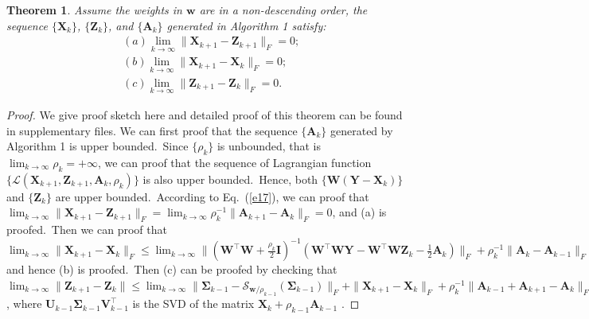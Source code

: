 \documentclass[10pt,twocolumn,letterpaper,sort&compress]{article}
\newtheorem{theorem}{Theorem}
\begin{document}
\begin{theorem}
\label{t1}
Assume the weights in $\bm{w}$ are in a non-descending order, the sequence $\{\mathbf{X}_{k}\}$, $\{\mathbf{Z}_{k}\}$, and $\{\mathbf{A}_{k}\}$ generated in Algorithm 1 satisfy:
\begin{align}
&(a) \lim_{k \to \infty} \|\mathbf{X}_{k+1}-\mathbf{Z}_{k+1}\|_{F}=0;
\\
&(b) \lim_{k \to \infty} \|\mathbf{X}_{k+1}-\mathbf{X}_{k}\|_{F}=0;
\\
&(c) \lim_{k \to \infty} \|\mathbf{Z}_{k+1}-\mathbf{Z}_{k}\|_{F}=0.
\end{align}
\end{theorem}
\begin{proof}
We give proof sketch here and detailed proof of this theorem can be found in supplementary files. We can first proof that the sequence $\{\mathbf{A}_{k}\}$ generated by Algorithm 1 is upper bounded.\ Since $\{\rho_{k}\}$ is unbounded, that is $\lim_{k\to\infty}{\rho_{k}}=+\infty$, we can proof that the sequence of Lagrangian function $\{\mathcal{L}(\mathbf{X}_{k+1},\mathbf{Z}_{k+1},\mathbf{A}_{k},\rho_{k})\}$ is also upper bounded.\
Hence, both $\{\mathbf{W}(\mathbf{Y}-\mathbf{X}_{k})\}$ and $\{\mathbf{Z}_{k}\}$ are upper bounded.\ According to Eq.\ (\ref{e17}), we can proof that 
$
\lim_{k \to \infty} 
\|
\mathbf{X}_{k+1}
-
\mathbf{Z}_{k+1}
\|_{F}
=
\lim_{k \to \infty} 
\rho_{k}^{-1}
\|
\mathbf{A}_{k+1}
-
\mathbf{A}_{k}
\|_{F}
=
0
$,
and (a) is proofed.\ Then we can proof that 
$
\lim_{k \to \infty} 
\|
\mathbf{X}_{k+1}
-
\mathbf{X}_{k}
\|_{F}
\le
\lim_{k \to \infty} 
\|
(\mathbf{W}^{\top}\mathbf{W}
+
\frac{\rho_{k}}{2}
\mathbf{I})^{-1}
(\mathbf{W}^{\top}\mathbf{W}\mathbf{Y}
-
\mathbf{W}^{\top}\mathbf{W}\mathbf{Z}_{k}
-
\frac{1}{2}
\mathbf{A}_{k})
\|_{F}
+
\rho_{k}^{-1}\|
\mathbf{A}_{k}-\mathbf{A}_{k-1}
\|_{F}
=
0
$
and hence (b) is proofed.\ Then (c) can be proofed by checking that 
$
\lim_{k \to \infty} \|\mathbf{Z}_{k+1}-\mathbf{Z}_{k}\|
\le
\lim_{k \to \infty} 
\|
\mathbf{\Sigma}_{k-1}-\mathcal{S}_{\bm{w}/\rho_{k-1}}(\mathbf{\Sigma}_{k-1})
\|_{F}
+
\|
\mathbf{X}_{k+1}-\mathbf{X}_{k}
\|_{F}
+
\rho_{k}^{-1}
\|
\mathbf{A}_{k-1}
+
\mathbf{A}_{k+1}
-
\mathbf{A}_{k}
\|_{F}
=
0
$
,
where $\mathbf{U}_{k-1}\mathbf{\Sigma}_{k-1}\mathbf{V}_{k-1}^{\top}$ is the SVD of the matrix $\mathbf{X}_{k}+\rho_{k-1}\mathbf{A}_{k-1}$
.
\end{proof}
\end{document}
